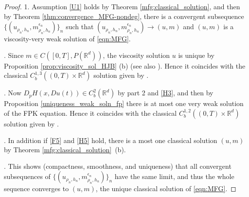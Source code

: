 \documentclass[a4paper,  twoside, 10pt, leqno]{amsart}
\newcommand{\rd}{\mathbb{R}^d}
\theoremstyle{remark}
\newtheorem{remark}[thm]{Remark}
\theoremstyle{definition}
\begin{document}
\begin{proof}
1. Assumption \ref{U1} holds by Theorem \ref{mfg:classical_solution}, and then by Theorem \ref{thm:convergence_MFG-nondeg}, there is a convergent subsequence $\{(u_{\rho_n, h_n}, m_{\rho_n,h_n}^{\epsilon_n} )\}_n$ such that
$(u_{\rho_n, h_n}, m_{\rho_n,h_n}^{\epsilon_n} ) \to (u,m)$ and $(u,m)$ is a viscosity-very weak solution of \eqref{eqn:MFG}. 

\smallskip{}. Since $m \in C ([0,T] , P (\rd))$, the viscosity
solution $u$ is unique by Proposition \ref{prop:viscosity_sol_HJB} (b) (see also \cite[Theorem $5.3$]{ersland2020classical}). Hence it coincides with the classical $C_b^{1,3} ((0,T) \times \rd)$ solution given by 
\cite[Theorem $5.5$]{ersland2020classical}. 

\smallskip{}. Now $D_p H (x,Du (t)) \in C_b^2 (\rd)$ by part 2 and \ref{H3}, and then by Proposition \ref{uniqueness_weak_soln_fp} there is at most one very weak solution of the FPK equation. Hence it coincides with the classical $C_b^{1,2}((0,T) \times \rd)$ solution given by \cite[Proposition $6.8$]{ersland2020classical}. 

\smallskip{}. In addition if 
\ref{F5} and 
\ref{H5} hold, there is a most one classical solution $(u,m)$ by Theorem \ref{mfg:classical_solution}~(b). 

\smallskip{}. This shows (compactness, smoothness, and uniqueness) that all convergent subsequences of $\{(u_{\rho_n, h_n}, m_{\rho_n,h_n}^{\epsilon_n} )\}_n$ have the same limit, and thus the whole sequence converges to $(u,m)$, the unique classical solution of  \eqref{eqn:MFG}.
\end{proof}

\end{document}
